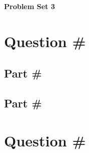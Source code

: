 \documentclass[letterpaper]{article}
\begin{document}
\vspace*{6pt}

\noindent \textbf{\huge{Problem Set 3}}

\bigskip

\section{Question \#}

\subsection{Part \#}

\subsection{Part \#}

\section{Question \#}
\end{document}
